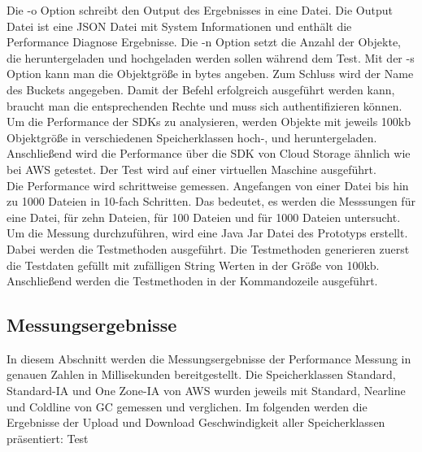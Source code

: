 Die -o Option schreibt den Output des Ergebnisses in eine Datei. Die Output Datei ist eine JSON Datei mit System Informationen und enthält die Performance Diagnose Ergebnisse. Die -n Option setzt die Anzahl der Objekte, die heruntergeladen und hochgeladen werden sollen während dem Test. Mit der -s Option kann man die Objektgröße in bytes angeben. Zum Schluss wird der Name des Buckets angegeben. Damit der Befehl erfolgreich ausgeführt werden kann, braucht man die entsprechenden Rechte und muss sich authentifizieren können.\\

Um die Performance der SDKs zu analysieren, werden Objekte mit jeweils 100kb Objektgröße in verschiedenen Speicherklassen hoch-, und heruntergeladen. Anschließend wird die Performance über die SDK von Cloud Storage ähnlich wie bei AWS getestet. Der Test wird auf einer virtuellen Maschine ausgeführt.\\

Die Performance wird schrittweise gemessen. Angefangen von einer Datei bis hin zu 1000 Dateien in 10-fach Schritten. Das bedeutet, es werden die Messsungen für eine Datei, für zehn Dateien, für 100 Dateien und für 1000 Dateien untersucht. Um die Messung durchzuführen, wird eine Java Jar Datei des Prototyps erstellt. Dabei werden die Testmethoden ausgeführt. Die Testmethoden generieren zuerst die Testdaten gefüllt mit zufälligen String Werten in der Größe von 100kb. Anschließend werden die Testmethoden in der Kommandozeile ausgeführt.

\newpage

\subsection{Messungsergebnisse}

In diesem Abschnitt werden die Messungsergebnisse der Performance Messung in genauen Zahlen in Millisekunden bereitgestellt. Die Speicherklassen Standard, Standard-IA und One Zone-IA von AWS wurden jeweils mit Standard, Nearline und Coldline von GC gemessen und verglichen. Im folgenden werden die Ergebnisse der Upload und Download Geschwindigkeit aller Speicherklassen präsentiert: Test

